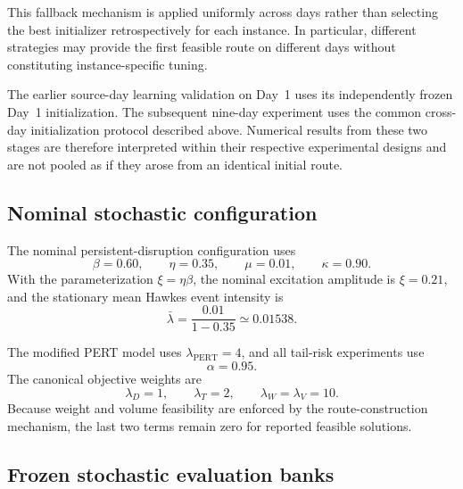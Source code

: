 \documentclass[preprint,12pt]{elsarticle}
\newcommand{\1}{\mathbf{1}}
\begin{document}
This fallback mechanism is applied uniformly across days rather than selecting
the best initializer retrospectively for each instance. In particular, different
strategies may provide the first feasible route on different days without
constituting instance-specific tuning.

The earlier source-day learning validation on Day~1 uses its independently
frozen Day~1 initialization. The subsequent nine-day experiment uses the common
cross-day initialization protocol described above. Numerical results from these
two stages are therefore interpreted within their respective experimental
designs and are not pooled as if they arose from an identical initial route.

\subsection{Nominal stochastic configuration}
\label{subsec:nominal_configuration}

The nominal persistent-disruption configuration uses
\begin{equation}
	\beta=0.60,
	\qquad
	\eta=0.35,
	\qquad
	\mu=0.01,
	\qquad
	\kappa=0.90.
	\label{eq:nominal_hawkes_parameters}
\end{equation}
With the parameterization $\xi=\eta\beta$, the nominal excitation amplitude is
$\xi=0.21$, and the stationary mean Hawkes event intensity is
\begin{equation}
	\bar{\lambda}
	=
	\frac{0.01}{1-0.35}
	\simeq
	0.01538.
\end{equation}

The modified PERT model uses
$\lambda_{\mathrm{PERT}}=4$, and all tail-risk experiments use
\begin{equation}
	\alpha=0.95.
\end{equation}
The canonical objective weights are
\begin{equation}
	\lambda_D=1,
	\qquad
	\lambda_T=2,
	\qquad
	\lambda_W=\lambda_V=10.
	\label{eq:objective_weights}
\end{equation}
Because weight and volume feasibility are enforced by the route-construction
mechanism, the last two terms remain zero for reported feasible solutions.

\subsection{Frozen stochastic evaluation banks}
\label{subsec:frozen_banks}
\end{document}
